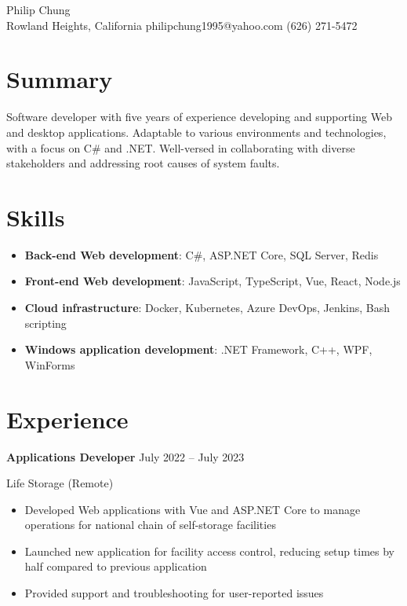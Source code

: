 \documentclass[12pt]{article}
\newcommand{\titleheader}[2]{\textbf{#1} \symbol{"B7} #2}
\newcommand{\locheader}[2]{#1 (#2)}
\begin{document}
	\begin{center}
		{\fontsize{24pt}{24pt}\selectfont Philip Chung} \\ \vspace{0.5em}
		Rowland Heights, California  philipchung1995@yahoo.com  (626) 271-5472
	\end{center}

	\section*{Summary}

	Software developer with five years of experience developing and supporting Web and desktop applications. Adaptable to various environments and technologies, with a focus on C\# and .NET. Well-versed in collaborating with diverse stakeholders and addressing root causes of system faults.

	\section*{Skills}

	\newcommand{\skillitem}[2]{\item \textbf{#1}: #2}

	\begin{itemize}[left=0in .. 0.125in]
		\skillitem{Back-end Web development}{C\#, ASP.NET Core, SQL Server, Redis}
		\skillitem{Front-end Web development}{JavaScript, TypeScript, Vue, React, Node.js}
		\skillitem{Cloud infrastructure}{Docker, Kubernetes, Azure DevOps, Jenkins, Bash scripting}
		\skillitem{Windows application development}{.NET Framework, C++, WPF, WinForms}
	\end{itemize}

	\section*{Experience}

	\titleheader{Applications Developer}{July 2022 -- July 2023}

	\locheader{Life Storage}{Remote}

	\begin{itemize}
		\item Developed Web applications with Vue and ASP.NET Core to manage operations for national chain of self-storage facilities
		\item Launched new application for facility access control, reducing setup times by half compared to previous application
		\item Provided support and troubleshooting for user-reported issues
	\end{itemize}
\end{document}
